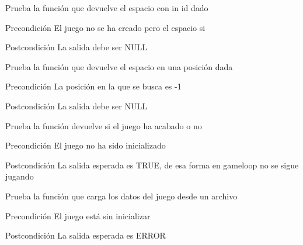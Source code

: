 \begin{DoxyRefList}
\item[\label{test__test000087}%
\hypertarget{test__test000087}{}%
Global \hyperlink{game__test_8c_a16d48c8d8035f259dedc9460c636e8c5}{test2\-\_\-game\-\_\-get\-\_\-space} ()]Prueba la función que devuelve el espacio con in id dado \begin{DoxyPrecond}{Precondición}
El juego no se ha creado pero el espacio si 
\end{DoxyPrecond}
\begin{DoxyPostcond}{Postcondición}
La salida debe ser N\-U\-L\-L  
\end{DoxyPostcond}

\item[\label{test__test000090}%
\hypertarget{test__test000090}{}%
Global \hyperlink{game__test_8c_a6f52b0a124ef9220a65d709bab5ea13f}{test2\-\_\-game\-\_\-get\-\_\-space\-\_\-at} ()]Prueba la función que devuelve el espacio en una posición dada \begin{DoxyPrecond}{Precondición}
La posición en la que se busca es -\/1 
\end{DoxyPrecond}
\begin{DoxyPostcond}{Postcondición}
La salida debe ser N\-U\-L\-L  
\end{DoxyPostcond}

\item[\label{test__test000067}%
\hypertarget{test__test000067}{}%
Global \hyperlink{game__test_8c_aad6c50be5f1d541ca5414b86558ef422}{test2\-\_\-game\-\_\-is\-\_\-over} ()]Prueba la función devuelve si el juego ha acabado o no \begin{DoxyPrecond}{Precondición}
El juego no ha sido inicializado 
\end{DoxyPrecond}
\begin{DoxyPostcond}{Postcondición}
La salida esperada es T\-R\-U\-E, de esa forma en gameloop no se sigue jugando  
\end{DoxyPostcond}

\item[\label{test__test000057}%
\hypertarget{test__test000057}{}%
Global \hyperlink{game__management__test_8c_a507fc7bcd3073298c0e78ff651b864f3}{test2\-\_\-game\-\_\-management\-\_\-load} ()]Prueba la función que carga los datos del juego desde un archivo \begin{DoxyPrecond}{Precondición}
El juego está sin inicializar 
\end{DoxyPrecond}
\begin{DoxyPostcond}{Postcondición}
La salida esperada es E\-R\-R\-O\-R  
\end{DoxyPostcond}


\end{DoxyRefList}
